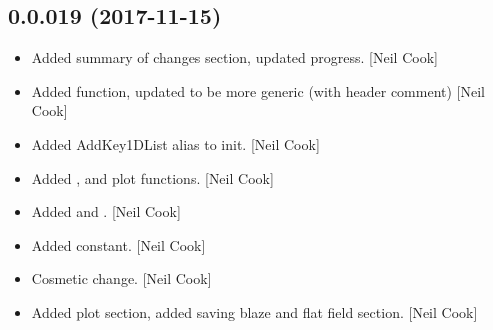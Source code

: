 \documentclass[a4paper,10pt,english]{report}
\begin{document}
\subsection{0.0.019 (2017-11-15)}
\label{\detokenize{misc/changelog:id532}}\begin{itemize}
\item {} 
Added  summary of changes section, updated progress. {[}Neil
Cook{]}

\item {} 
Added  function, updated  to be more
generic (with header comment) {[}Neil Cook{]}

\item {} 
Added AddKey1DList alias to init. {[}Neil Cook{]}

\item {} 
Added ,
 and  plot
functions. {[}Neil Cook{]}

\item {} 
Added  and . {[}Neil Cook{]}

\item {} 
Added  constant. {[}Neil Cook{]}

\item {} 
Cosmetic change. {[}Neil Cook{]}

\item {} 
Added plot section, added saving blaze and flat field section. {[}Neil
Cook{]}

\end{itemize}
\end{document}
